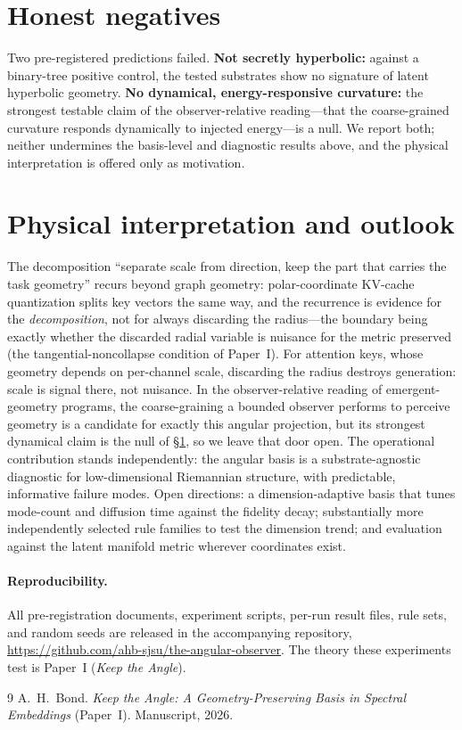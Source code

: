 \documentclass[11pt]{article}
\begin{document}
\section{Honest negatives}\label{sec:neg}
Two pre-registered predictions failed. \textbf{Not secretly hyperbolic:} against a
binary-tree positive control, the tested substrates show no signature of latent hyperbolic
geometry. \textbf{No dynamical, energy-responsive curvature:} the strongest testable claim
of the observer-relative reading---that the coarse-grained curvature responds dynamically
to injected energy---is a null. We report both; neither undermines the basis-level and
diagnostic results above, and the physical interpretation is offered only as motivation.

\section{Physical interpretation and outlook}\label{sec:physical}
The decomposition ``separate scale from direction, keep the part that carries the task
geometry'' recurs beyond graph geometry: polar-coordinate KV-cache quantization splits key
vectors the same way, and the recurrence is evidence for the \emph{decomposition}, not for
always discarding the radius---the boundary being exactly whether the discarded radial
variable is nuisance for the metric preserved (the tangential-noncollapse condition of
Paper~I). For attention keys, whose geometry depends on per-channel scale, discarding the
radius destroys generation: scale is signal there, not nuisance. In the observer-relative
reading of emergent-geometry programs, the coarse-graining a bounded observer performs to
perceive geometry is a candidate for exactly this angular projection, but its strongest
dynamical claim is the null of \S\ref{sec:neg}, so we leave that door open. The operational
contribution stands independently: the angular basis is a substrate-agnostic diagnostic for
low-dimensional Riemannian structure, with predictable, informative failure modes. Open
directions: a dimension-adaptive basis that tunes mode-count and diffusion time against the
fidelity decay; substantially more independently selected rule families to test the
dimension trend; and evaluation against the latent manifold metric wherever coordinates
exist.

\paragraph{Reproducibility.} All pre-registration documents, experiment scripts, per-run
result files, rule sets, and random seeds are released in the accompanying repository,
\url{https://github.com/ahb-sjsu/the-angular-observer}. The theory these experiments test
is Paper~I (\emph{Keep the Angle}).

\begin{thebibliography}{9}
 A.~H.~Bond. \emph{Keep the Angle: A Geometry-Preserving Basis in
Spectral Embeddings} (Paper~I). Manuscript, 2026.
\end{thebibliography}
\end{document}
